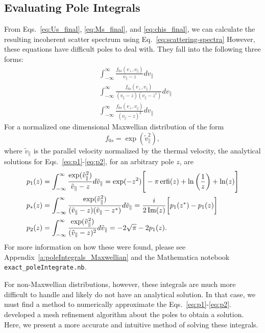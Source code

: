 \subsection{Evaluating Pole Integrals}

From Eqs.~\ref{eq:Us_final}, \ref{eq:Ms_final}, and \ref{eq:chis_final}, we can calculate the resulting incoherent scatter spectrum using Eq.~\ref{eq:scattering-spectra}
However, these equations have difficult poles to deal with. 
They fall into the following three forms:
\begin{align}
	&\int_{-\infty}^\infty \frac{f_{0s}(v_\perp, v_\parallel)}{v_\parallel-z} dv_\parallel
	\label{eq:p1} \\
	&\int_{-\infty}^\infty \frac{f_{0s}(v_\perp, v_\parallel)}{(v_\parallel-z)(v_\parallel-z^*)} dv_\parallel 
	\label{eq:pstar}  \\
	&\int_{-\infty}^\infty \frac{f_{0s}(v_\perp, v_\parallel)}{(v_\parallel-z)^2} dv_\parallel
	\label{eq:p2} 
\end{align}
For a normalized one dimensional Maxwellian distribution of the form
\begin{equation}
	f_{0s} = \exp(\tilde{v}_\parallel^2),
	\label{eq:norm_maxwellian}
\end{equation}
where $\tilde{v}_\parallel$ is the parallel velocity normalized by the thermal velocity,
the analytical solutions for Eqs.~\ref{eq:p1}-\ref{eq:p2}, for an arbitrary pole $z$, are
\begin{align}
	p_1(z) &= \int_{-\infty}^\infty \frac{\exp(\tilde{v}_\parallel^2)}{\tilde{v}_\parallel-z} d\tilde{v}_\parallel 
	= \exp(-z^2) \Bigg[ -\pi \operatorname{erfi}(z) + \ln\bigg(\frac{1}{z}\bigg) + \ln(z)  \Bigg]
	\label{eq:p1Exact} \\
	p_*(z) &= \int_{-\infty}^\infty \frac{\exp(\tilde{v}_\parallel^2)}{(\tilde{v}_\parallel-z)(\tilde{v}_\parallel-z^*)} d\tilde{v}_\parallel 
	= \frac{i}{2\operatorname{Im}(z)} \bigg[ p_1(z^*) - p_1(z) \bigg] 
	\label{eq:pstarExact} \\
	p_2(z) &= \int_{-\infty}^\infty \frac{\exp(\tilde{v}_\parallel^2)}{(\tilde{v}_\parallel-z)^2} d\tilde{v}_\parallel
	= - 2 \sqrt{\pi} - 2 p_1(z). 
	\label{eq:p2Exact}
\end{align}
For more information on how these were found, please see Appendix~\ref{a:poleIntegrals_Maxwellian} and the Mathematica notebook \verb*|exact_poleIntegrate.nb|.


For non-Maxwellian distributions, however, these integrals are much more difficult to handle and likely do not have an analytical solution.
In that case, we must find a method to numerically approximate the Eqs.~\ref{eq:p1}-\ref{eq:p2}.
\cite{longley2024} developed a mesh refinement algorithm about the poles to obtain a solution.
Here, we present a more accurate and intuitive method of solving these integrals. 


